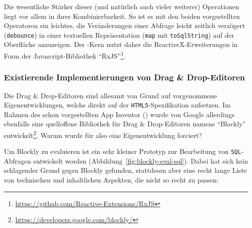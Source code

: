 Die wesentliche Stärker dieser (und natürlich auch vieler weiterer) Operationen liegt vor allem in ihrer Kombinierbarkeit. So ist es mit den beiden vorgestellten Operatoren ein leichtes, die Veränderungen einer Abfrage leicht zeitlich verzögert (\texttt{debounce}) in einer textuellen Repräsentation (\texttt{map} mit \texttt{toSqlString}) auf der Oberfläche anzuzeigen. Der \idename{}-Kern nutzt daher die ReactiveX-Erweiterungen in Form der Javascript-Bibliothek "`RxJS"'\footnote{\url{https://github.com/Reactive-Extensions/RxJS}}.

\subsubsection{Existierende Implementierungen von Drag \& Drop-Editoren}

Die Drag \& Drop-Editoren sind allesamt von Grund auf vorgenommene Eigenentwicklungen, welche direkt auf der \texttt{HTML5}-Spezifikation aufsetzen. Im Rahmen des schon vorgestellten App Inventor () wurde von Google allerdings ebenfalls eine quelloffene Bibliothek für Drag \& Drop-Editoren namens "`Blockly"' entwickelt\footnote{\url{https://developers.google.com/blockly/}}. Warum wurde für \idename{} also eine Eigenentwicklung forciert?

Um Blockly zu evaluieren ist ein sehr kleiner Prototyp zur Bearbeitung von \texttt{SQL}-Abfragen entwickelt worden (Abbildung~\ref{fig:blockly-eval-sql}). Dabei hat sich kein schlagender Grund gegen Blockly gefunden, stattdesen aber eine recht lange Liste von technischen und inhaltlichen Aspekten, die nicht so recht zu \idename{} passen:

